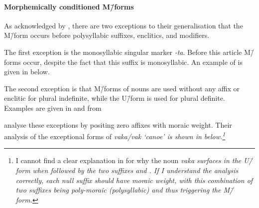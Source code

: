 \paragraph{Morphemically conditioned M\=/forms}
As acknowledged by \citet{haki98},
there are two exceptions to their generalisation
that the M\=/form occurs before polysyllabic suffixes,
enclitics, and modifiers.

The first exception is the monosyllabic singular marker \emph{-ta}.
Before this article M\=/forms occur, despite the fact that this suffix is monosyllabic.
An example of is given in  below.

\begin{exe}
\let\eachwordone=\itshape
	\label{RotUse6}
\end{exe}

The second exception is that M\=/forms of nouns are used without any
affix or enclitic for plural indefinite,
while the U\=/form is used for plural definite.
Examples are given in  and 
from \citet[15]{ch40}

\begin{multicols}{2}
	\begin{exe}\let\eachwordone=\itshape
		\label{ex:RotDef}
		\label{ex:RotInd}
	\end{exe}
\end{multicols}

\citet[121f]{haki98} analyse these exceptions by positing zero affixes with moraic weight.
Their analysis of the exceptional forms of \it{vaka/vak} `canoe'
is shown in  below.\footnote{
	I cannot find a clear explanation in \cite{haki98} for why the noun \it{vaka}
	surfaces in the U\=/form when followed by the two suffixes
	{\0} and {\0}.
	If I understand the analysis correctly,
	each null suffix should have moraic weight,
	with this combination of two suffixes being poly-moraic (polysyllabic)
	and thus triggering the M\=/form.}

